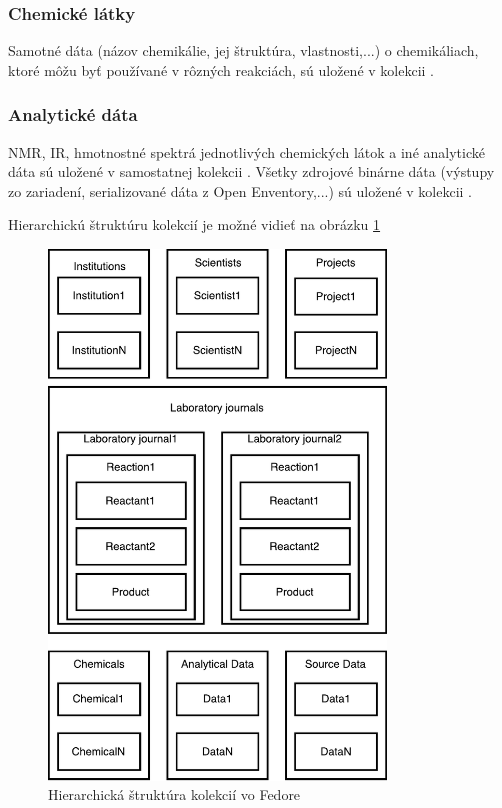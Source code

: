 \documentclass[thesis=M,slovak]{FITthesis}[2013/05/06]
\begin{document}
\subsubsection{Chemické látky}
Samotné dáta (názov chemikálie, jej štruktúra, vlastnosti,...) o chemikáliach, ktoré môžu byť používané v rôzných reakciách, sú uložené v kolekcii .

\subsubsection{Analytické dáta}
NMR, IR, hmotnostné spektrá jednotlivých chemických látok a iné analytické dáta sú uložené v samostatnej kolekcii . Všetky zdrojové binárne dáta (výstupy zo zariadení, serializované dáta z Open Enventory,...) sú uložené v kolekcii .

Hierarchickú štruktúru kolekcií je možné vidieť na obrázku \ref{graphics:CollectionsDiagram}

\begin{figure}[h]\centering
	\includegraphics[width=0.8\textwidth]{diagramy/Collections_Diagram.pdf}
 	\caption[Hierarchická štruktúra kolekcií vo Fedore]{Hierarchická štruktúra kolekcií vo Fedore}\label{graphics:CollectionsDiagram}
\end{figure}
\end{document}
